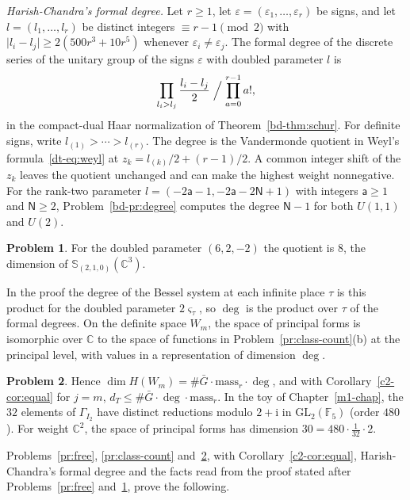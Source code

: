 \documentclass[reqno]{amsart}
\newcounter{chap}
\theoremstyle{plain}
\theoremstyle{definition}
\newtheorem{problem}{Problem}[section]
\theoremstyle{remark}
\newcommand{\C}{\mathbb{C}}
\newcommand{\F}{\mathbb{F}}
\newcommand{\Gb}{\bar G}
\newcommand{\mass}{\mathrm{mass}_r}
\newcommand{\GL}{\mathrm{GL}}
\begin{document}
\noindent\emph{Harish-Chandra's formal degree.}  Let \(r\ge1\), let \(\varepsilon=(\varepsilon_1,\dots,\varepsilon_r)\) be signs, and let \(l=(l_1,\dots,l_r)\) be distinct integers \(\equiv r-1 \pmod 2\) with \(\lvert l_i-l_j\rvert\ge2(500r^3+10r^5)\) whenever \(\varepsilon_i\ne\varepsilon_j\).  The formal degree of the discrete series of the unitary group of the signs \(\varepsilon\) with doubled parameter \(l\) is
\[
 \prod_{l_i > l_j}\frac{l_i - l_j}{2}\Bigm/\prod_{a=0}^{r-1}a! ,
\]
in the compact-dual Haar normalization of Theorem~\ref{bd-thm:schur}.  For definite signs, write \(l_{(1)} > \cdots > l_{(r)}\). The degree is the Vandermonde quotient in Weyl's formula~\eqref{dt-eq:weyl} at \(z_k = l_{(k)}/2 + (r-1)/2\). A common integer shift of the \(z_k\) leaves the quotient unchanged and can make the highest weight nonnegative.  For the rank-two parameter \(l=(-2\mathsf a-1,-2\mathsf a-2\mathsf N+1)\) with integers \(\mathsf a\ge1\) and \(\mathsf N\ge2\), Problem~\ref{bd-pr:degree} computes the degree \(\mathsf N-1\) for both \(U(1,1)\) and \(U(2)\).

\begin{problem}\label{pr:weyl-check}
For the doubled parameter \((6, 2, -2)\) the quotient is \(8\), the dimension of \(\mathbb S_{(2,1,0)}(\C^3)\).
\end{problem}

In the proof the degree of the Bessel system at each infinite place \(\tau\) is this product for the doubled parameter \(2\varsigma_\tau\), so \(\deg\) is the product over \(\tau\) of the formal degrees.  On the definite space \(W_m\), the space of principal forms is isomorphic over \(\C\) to the space of functions in Problem~\ref{pr:class-count}(b) at the principal level, with values in a representation of dimension \(\deg\).

\begin{problem}\label{pr:count-toy}
Hence \(\dim H(W_m) = \#\Gb\cdot\mass\cdot\deg\), and with Corollary~\ref{c2-cor:equal} for \(j = m\), \(d_T \le \#\Gb\cdot\deg\cdot\mass\).  In the toy of Chapter~\ref{m1-chap}, the \(32\) elements of \(\Gamma_{I_2}\) have distinct reductions modulo \(2 + \mathrm i\) in \(\GL_2(\F_5)\) (order \(480\)). For weight \(\C^2\), the space of principal forms has dimension \(30 = 480\cdot\tfrac1{32}\cdot2\).
\end{problem}

Problems~\ref{pr:free}, \ref{pr:class-count} and~\ref{pr:count-toy}, with Corollary~\ref{c2-cor:equal}, Harish-Chandra's formal degree and the facts read from the proof stated after Problems~\ref{pr:free} and~\ref{pr:weyl-check}, prove the following.
\end{document}

